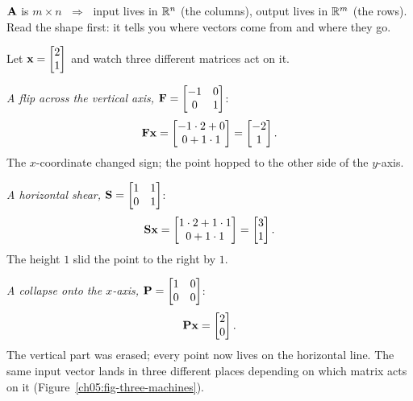 \begin{focusbox}
$\mathbf{A}$ is $m \times n$ $\;\Longrightarrow\;$ input lives in $\mathbb{R}^n$ (the
columns), output lives in $\mathbb{R}^m$ (the rows). Read the shape first: it tells you
where vectors come from and where they go.
\end{focusbox}

\begin{example}
\label{ch05:three-machines}
Let $\mathbf{x} = \begin{bmatrix}2\\1\end{bmatrix}$ and watch three different matrices act on it.

\emph{A flip across the vertical axis,} $\mathbf{F} = \begin{bmatrix} -1 & 0 \\ 0 & 1\end{bmatrix}$:
\[
  \mathbf{F}\mathbf{x} = \begin{bmatrix}-1\cdot 2 + 0 \\ 0 + 1\cdot 1\end{bmatrix} = \begin{bmatrix}-2\\1\end{bmatrix}.
\]
The $x$-coordinate changed sign; the point hopped to the other side of the
$y$-axis.

\emph{A horizontal shear,} $\mathbf{S} = \begin{bmatrix} 1 & 1 \\ 0 & 1\end{bmatrix}$:
\[
  \mathbf{S}\mathbf{x} = \begin{bmatrix}1\cdot 2 + 1 \cdot 1 \\ 0 + 1 \cdot 1\end{bmatrix} = \begin{bmatrix}3\\1\end{bmatrix}.
\]
The height $1$ slid the point to the right by $1$.

\emph{A collapse onto the $x$-axis,} $\mathbf{P} = \begin{bmatrix} 1 & 0 \\ 0 & 0\end{bmatrix}$:
\[
  \mathbf{P}\mathbf{x} = \begin{bmatrix}2\\0\end{bmatrix}.
\]
The vertical part was erased; every point now lives on the horizontal line.
The same input vector lands in three different places depending on which matrix
acts on it (Figure~\ref{ch05:fig-three-machines}).
\end{example}

